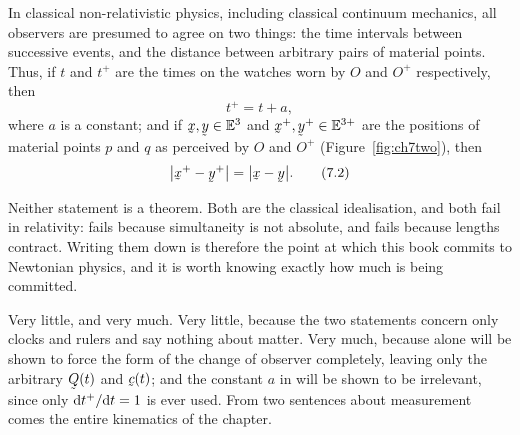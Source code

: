 In classical non-relativistic physics, including classical continuum
mechanics, all observers are presumed to agree on two things: the time
intervals between successive events, and the distance between arbitrary
pairs of material points. Thus, if $t$ and $t^{+}$ are the times on the
watches worn by $O$ and $O^{+}$ respectively, then
\begin{equation}
   t^{+}=t+a ,
   \tag{7.1}\label{eq:7.1}
\end{equation}
where $a$ is a constant; and if $\bx,\by\in\Et$ and
$\bx^{+},\by^{+}\in\mathbb{E}^{3+}$ are the positions of material points
$p$ and $q$ as perceived by $O$ and $O^{+}$ (Figure~\ref{fig:ch7two}),
then
\begin{equation}
   \big|\bx^{+}-\by^{+}\big|=\big|\bx-\by\big| .
   \tag{7.2}\label{eq:7.2}
\end{equation}

\begin{remark}\label{rem:ch7twoassump}
Neither statement is a theorem. Both are the classical idealisation, and
both fail in relativity:  fails because simultaneity is not
absolute, and  fails because lengths contract. Writing them down
is therefore the point at which this book commits to Newtonian physics,
and it is worth knowing exactly how much is being committed.

Very little, and very much. Very little, because the two statements
concern only clocks and rulers and say nothing about matter. Very much,
because  alone will be shown to force the form of the change of
observer completely, leaving only the arbitrary $\bQ(t)$ and $\bc(t)$; and
the constant $a$ in  will be shown to be irrelevant, since only
$\mathrm{d} t^{+}/\mathrm{d} t=1$ is ever used. From two sentences about measurement
comes the entire kinematics of the chapter.
\end{remark}

